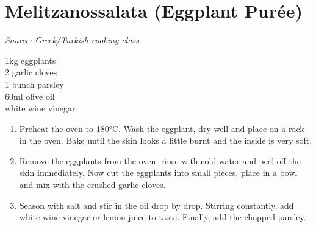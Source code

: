 \documentclass{report}
\begin{document}
\section{Melitzanossalata (Eggplant Purée)}
\textit{Source: Greek/Turkish cooking class}\\
\begin{minipage}[t]{0.21\textwidth} \vspace{0pt} 
1kg eggplants\\
2 garlic cloves\\
1 bunch parsley\\
60ml olive oil\\
white wine vinegar\\
\end{minipage}
\hfill
\begin{minipage}[t]{0.78\textwidth} \vspace{0pt}
	\begin{enumerate}
		\item Preheat the oven to 180°C. Wash the eggplant, dry well and place on a rack in the oven. Bake until the skin looks a little burnt and the inside is very soft. 
		\item Remove the eggplants from the oven, rinse with cold water and peel off the skin immediately. Now cut the eggplants into small pieces, place in a bowl and   mix with the crushed garlic cloves. 
		\item Season with salt and stir in the oil drop by drop. Stirring constantly, add white wine vinegar or lemon juice to taste.  Finally, add the chopped parsley.
	\end{enumerate}	
\end{minipage}
\end{document}

